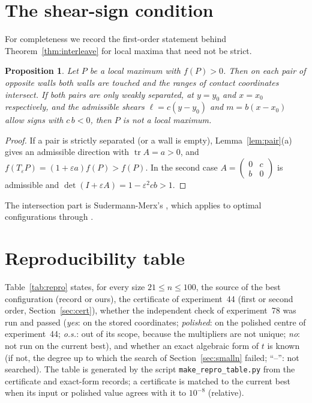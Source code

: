 \documentclass[11pt]{amsart}
\newtheorem{proposition}[theorem]{Proposition}
\theoremstyle{definition}
\newcommand{\tr}{\operatorname{tr}}
\begin{document}
\section{The shear-sign condition}\label{app:shear}
For completeness we record the first-order statement behind Theorem~\ref{thm:interleave} for local maxima that need not be strict. %
\begin{proposition}
Let $P$ be a local maximum with $f(P) > 0$. Then on each pair of opposite walls both walls are touched and the ranges of contact coordinates intersect. If both pairs are only weakly separated, at $y = y_0$ and $x = x_0$ respectively, and the admissible shears $\ell = c(y - y_0)$ and $m = b(x - x_0)$ allow signs with $c\, b < 0$, then $P$ is not a local maximum.
\end{proposition}
\begin{proof}
If a pair is strictly separated (or a wall is empty), Lemma~\ref{lem:pair}(a) gives an admissible direction with $\tr A = a > 0$, and $f(T_\varepsilon P) = (1+\varepsilon a) f(P) > f(P)$. In the second case $A = \begin{pmatrix} 0 & c \\ b & 0\end{pmatrix}$ is admissible and $\det(I + \varepsilon A) = 1 - \varepsilon^2 c b > 1$.
\end{proof}
The intersection part is Sudermann-Merx's \cite[Lemma~2(C)]{SM}, which applies to optimal configurations through \cite[Lemma~1]{SM}.

\section{Reproducibility table}\label{app:repro}
Table~\ref{tab:repro} states, for every size $21 \le n \le 100$, the source of the best configuration (record \cite{Stead} or ours), the certificate of experiment~44 (first or second order, Section~\ref{sec:cert}), whether the independent check of experiment~78 was run and passed (\emph{yes}: on the stored coordinates; \emph{polished}: on the polished centre of experiment~44; \emph{o.s.}: out of its scope, because the multipliers are not unique; \emph{no}: not run on the current best), and whether an exact algebraic form of $t$ is known (if not, the degree up to which the search of Section~\ref{sec:smalln} failed; ``--'': not searched). The table is generated by the script \texttt{make\_repro\_table.py} from the certificate and exact-form records; a certificate is matched to the current best when its input or polished value agrees with it to $10^{-8}$ (relative).
\end{document}
